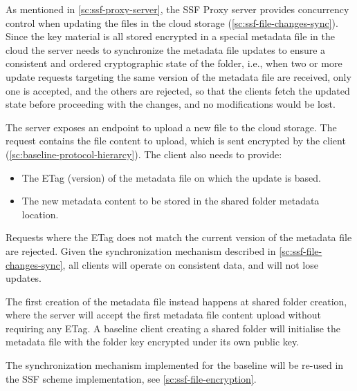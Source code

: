 As mentioned in \cref{sc:ssf-proxy-server}, the
SSF Proxy server provides concurrency control
when updating the files in the cloud storage (\cref{sc:ssf-file-changes-sync}).
Since the key material is all stored encrypted in a special metadata file
in the cloud
the server needs to synchronize the metadata file updates
to ensure a consistent and ordered cryptographic state of the folder,
i.e., when two or more update requests targeting the same version of the metadata file are received, only one is
accepted, and the others are rejected, so that the
clients fetch the updated state before proceeding
with the changes, and no modifications would be lost.

The server exposes an endpoint to upload a new file
to the cloud storage. The request contains the file
content to upload, which is sent encrypted by the client
(\cref{sc:baseline-protocol-hierarcy}). The client
also needs to provide:
\begin{itemize}
    \item The ETag (version) of the metadata file on which the update is based.
    \item The new metadata content to be stored in the shared folder metadata location.
\end{itemize}
Requests where the ETag does not match the current version
of the metadata file are rejected. Given the
synchronization mechanism described in \cref{sc:ssf-file-changes-sync},
all clients will operate on consistent data, and
will not lose updates.

The first creation of the metadata file instead happens
at shared folder creation, where the server will
accept the first metadata file content upload
without requiring any ETag. A baseline client
creating a shared folder will initialise the metadata
file with the folder key encrypted under its own
public key.

The synchronization mechanism implemented
for the baseline will be re-used in the SSF scheme
implementation, see \cref{sc:ssf-file-encryption}.
